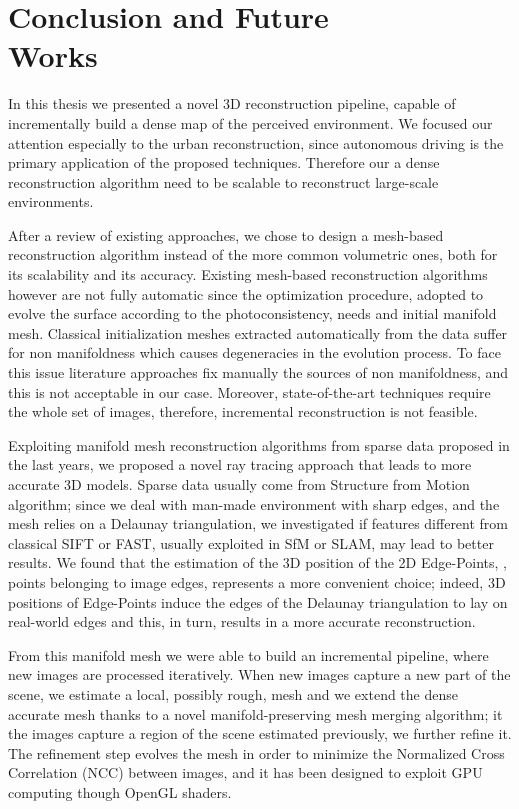\chapter[Conclusion and Future Works]{Conclusion and Future \\Works}
\label{ch:future_works}
In this thesis we presented a novel 3D reconstruction pipeline, capable of incrementally build a dense map of the perceived environment.
We focused our attention especially to the urban reconstruction, since autonomous driving is the primary application of the proposed techniques.
Therefore our a dense reconstruction algorithm need to be scalable  to reconstruct large-scale environments.


After a review of existing approaches, we chose to design a mesh-based reconstruction algorithm instead of the more common volumetric ones, both for its scalability and its accuracy. 
Existing mesh-based reconstruction algorithms however are not fully automatic since the optimization procedure, adopted to evolve the surface according to the photoconsistency, needs and initial manifold mesh. 
Classical initialization meshes extracted automatically from the data suffer for non manifoldness which causes degeneracies in the evolution process. 
To face this issue literature approaches fix manually the sources of non manifoldness, and this is not acceptable in our case. 
Moreover, state-of-the-art techniques require the whole set of images, therefore, incremental reconstruction is not feasible.

Exploiting  manifold mesh reconstruction algorithms from sparse data proposed in the last years, we proposed a  novel ray tracing approach that leads to more accurate 3D models. 
Sparse data usually come from Structure from Motion algorithm; since we deal with man-made environment with sharp edges, and the mesh relies on a Delaunay triangulation, we investigated if features different from classical SIFT or FAST, usually exploited in SfM or SLAM, may lead to better results. 
We found that the estimation of the 3D position of the 2D Edge-Points, \ie, points belonging to image edges, represents a more convenient choice; indeed, 3D positions of Edge-Points induce the edges of the Delaunay triangulation to lay on real-world edges and this, in turn, results in a more accurate reconstruction.

From this manifold mesh we were able to build an incremental pipeline, where new images are processed iteratively.
When new images  capture a new part of the scene, we estimate a local, possibly rough, mesh and we extend the dense accurate mesh thanks to a novel manifold-preserving mesh merging algorithm; it the images capture a region of the scene estimated previously, we further refine it.
The refinement step evolves the mesh in order to minimize the Normalized Cross Correlation (NCC) between images, and it has been designed to exploit GPU computing though OpenGL shaders.

